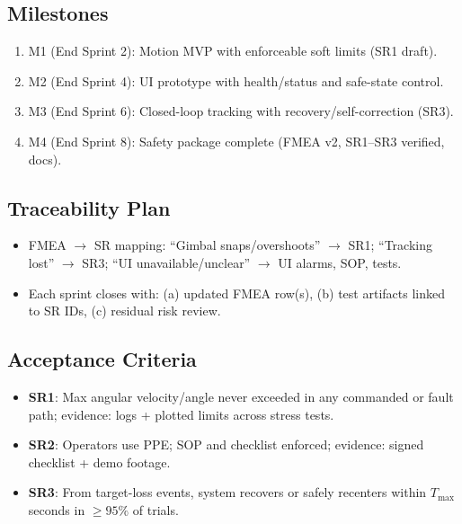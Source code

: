 \documentclass{article}
\begin{document}
\subsection{Milestones}
\begin{enumerate}
  \item M1 (End Sprint 2): Motion MVP with enforceable soft limits (SR1 draft).
  \item M2 (End Sprint 4): UI prototype with health/status and safe-state control.
  \item M3 (End Sprint 6): Closed-loop tracking with recovery/self-correction (SR3).
  \item M4 (End Sprint 8): Safety package complete (FMEA v2, SR1–SR3 verified, docs).
\end{enumerate}

\subsection{Traceability Plan}
\begin{itemize}
  \item FMEA \(\rightarrow\) SR mapping: “Gimbal snaps/overshoots” \(\rightarrow\) SR1; “Tracking lost” \(\rightarrow\) SR3; “UI unavailable/unclear” \(\rightarrow\) UI alarms, SOP, tests.
  \item Each sprint closes with: (a) updated FMEA row(s), (b) test artifacts linked to SR IDs, (c) residual risk review.
\end{itemize}

\subsection{Acceptance Criteria}
\begin{itemize}
  \item \textbf{SR1}: Max angular velocity/angle never exceeded in any commanded or fault path; evidence: logs + plotted limits across stress tests.
  \item \textbf{SR2}: Operators use PPE; SOP and checklist enforced; evidence: signed checklist + demo footage.
  \item \textbf{SR3}: From target-loss events, system recovers or safely recenters within \(T_{\max}\) seconds in \(\geq 95\%\) of trials.
\end{itemize}
\end{document}
